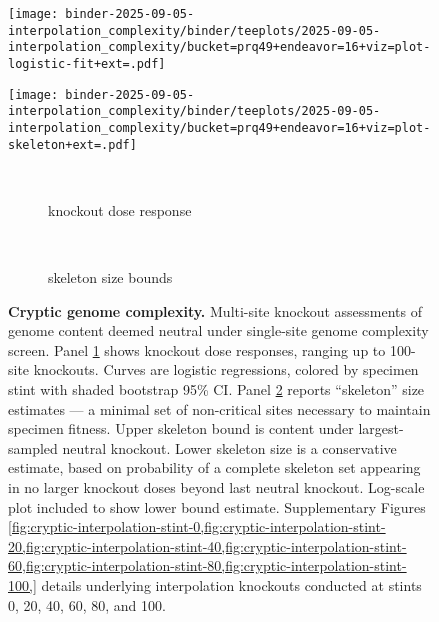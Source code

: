\begin{figure}

\begin{minipage}{\linewidth}
\centering
\begin{minipage}{0.4\linewidth}
\texttt{[image: binder-2025-09-05-interpolation\_complexity/binder/teeplots/2025-09-05-interpolation\_complexity/bucket=prq49+endeavor=16+viz=plot-logistic-fit+ext=.pdf]}
\end{minipage}%
\begin{minipage}{0.6\linewidth}
\texttt{[image: binder-2025-09-05-interpolation\_complexity/binder/teeplots/2025-09-05-interpolation\_complexity/bucket=prq49+endeavor=16+viz=plot-skeleton+ext=.pdf]}
\end{minipage}
\end{minipage}

\vspace{-1ex}\textsc{}

\begin{minipage}{\linewidth}
\centering
\begin{subfigure}[t]{0.05\linewidth}
~
\end{subfigure}%
\begin{subfigure}[t]{0.4\linewidth}
\centering
\caption{\footnotesize knockout dose response}
\label{fig:cryptic:logistic}
\end{subfigure}%
\begin{subfigure}[t]{0.05\linewidth}
~
\end{subfigure}%
\begin{subfigure}[t]{0.5\linewidth}
\centering
\caption{\footnotesize skeleton size bounds}
\label{fig:cryptic:skeleton}
\end{subfigure}
\end{minipage}

\caption{
\textbf{Cryptic genome complexity.}
\footnotesize
Multi-site knockout assessments of genome content deemed neutral under single-site genome complexity screen.
Panel \ref{fig:cryptic:logistic} shows knockout dose responses, ranging up to 100-site knockouts.
Curves are logistic regressions, colored by specimen stint with shaded bootstrap 95\% CI.
Panel \ref{fig:cryptic:skeleton} reports ``skeleton'' size estimates --- a minimal set of non-critical sites necessary to maintain specimen fitness.
Upper skeleton bound is content under largest-sampled neutral knockout.
Lower skeleton size is a conservative estimate, based on probability of a complete skeleton set appearing in no larger knockout doses beyond last neutral knockout.
Log-scale plot included to show lower bound estimate.
Supplementary Figures \cref{fig:cryptic-interpolation-stint-0,fig:cryptic-interpolation-stint-20,fig:cryptic-interpolation-stint-40,fig:cryptic-interpolation-stint-60,fig:cryptic-interpolation-stint-80,fig:cryptic-interpolation-stint-100,} details underlying interpolation knockouts conducted at stints 0, 20, 40, 60, 80, and 100.
}
\label{fig:cryptic}

\end{figure}
